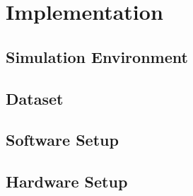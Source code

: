 \chapter{Implementation}
\section{Simulation Environment}

\section{Dataset}

\section{Software Setup}

\section{Hardware Setup}